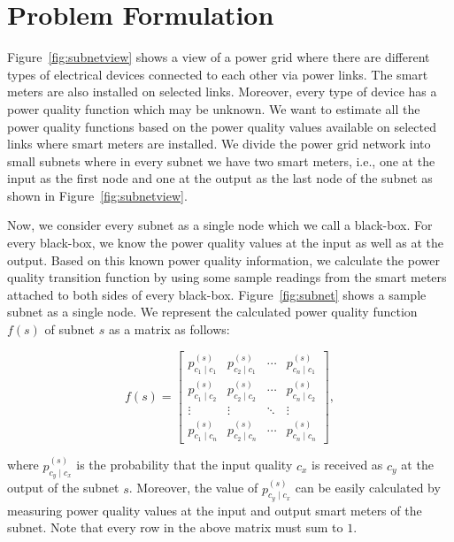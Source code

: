 \section{Problem Formulation}
Figure~\ref{fig:subnetview} shows a view of a power grid where there are different types of electrical devices connected to each other via power links. The smart meters are also installed on selected links. Moreover, every type of device has a power quality function which may be unknown. We want to estimate all the power quality functions based on the power quality values available on selected links where smart meters are installed. We divide the power grid network into small subnets where in every subnet we have two smart meters, i.e., one at the input as the first node and one at the output as the last node of the subnet as shown in Figure~\ref{fig:subnetview}.

Now, we consider every subnet as a single node which we call a black-box. For every black-box, we know the power quality values at the input as well as at the output. Based on this known power quality information, we calculate the power quality transition function by using some sample readings from the smart meters attached to both sides of every black-box. Figure~\ref{fig:subnet} shows a sample subnet as a single node. We represent the calculated power quality function $f(s)$  of subnet $s$ as a matrix as follows:

\begin{equation}
f(s) = \left[\begin{array}{cccc} p_{c_1 \mid c_1}^{(s)} & p_{c_2 \mid c_1}^{(s)} & \cdots & p_{c_n \mid c_1}^{(s)}\\
p_{c_1 \mid c_2}^{(s)} & p_{c_2 \mid c_2}^{(s)} & \cdots & p_{c_n \mid c_2}^{(s)}\\
\vdots & \vdots& \ddots & \vdots\\
p_{c_1 \mid c_n}^{(s)} & p_{c_2 \mid c_n}^{(s)} & \cdots & p_{c_n \mid c_n}^{(s)}
\end{array}\right],
\end{equation}

\noindent
where $p_{c_y  \mid c_x}^{(s)}$ is the probability that the input quality $c_x$ is received as $c_y$ at the output of the subnet $s$. Moreover, the value of $p_{c_y  \mid c_x}^{(s)}$ can be easily calculated by measuring power quality values at the input and output smart meters of the subnet. Note that every row in the above matrix must sum to $1$.

